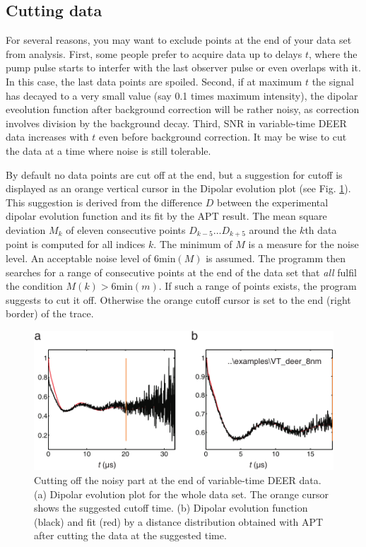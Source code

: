 \documentclass{article}
\begin{document}
\subsection{Cutting data}
For several reasons, you may want to exclude points at the end of
your data set from analysis. First, some people prefer to acquire data up to
delays $t$, where the pump pulse starts to interfer with the last observer pulse
or even overlaps with it. In this case, the last data points are spoiled. Second,
if at maximum $t$ the signal has decayed to a very small value (say 0.1 times
maximum intensity), the dipolar eveolution function after background correction
will be rather noisy, as correction involves division by the background decay.
Third, SNR in variable-time DEER data increases with $t$ even before background
correction. It may be wise to cut the data at a time where noise is still tolerable.

By default no data points are cut off at the end, but a suggestion for cutoff is displayed as an orange vertical cursor in the {\ttfamily Dipolar evolution} plot (see Fig. \ref{fig:manfig4}). This suggestion is derived from the difference $D$ between the experimental dipolar evolution function and its fit by the APT result. The mean square deviation $M_k$ of eleven consecutive points $D_{k-5}\ldots D_{k+5}$ around the $k$th data point is computed for all indices $k$. The minimum of $M$ is a measure for the noise level. An acceptable noise level of $6\mathrm{min}(M)$ is assumed. The programm then searches for a range of consecutive points at the end of the data set that \emph{all} fulfil the condition $M(k)>6\mathrm{min}(m)$. If such a range of points exists, the program suggests to cut it off. Otherwise the orange cutoff cursor is set to the end (right border) of the trace.

\begin{figure}[ht]
 	\begin{center}
  \includegraphics[width=1.0\textwidth]{fig4.pdf}
	\end{center}
	\caption{Cutting off the noisy part at the end of variable-time DEER data. (a) {\ttfamily Dipolar evolution} plot for the whole data set. The orange cursor shows the suggested cutoff time. (b) Dipolar evolution function (black) and
fit (red) by a distance distribution obtained with APT after cutting the data at the suggested time.}
	\label{fig:manfig4}
\end{figure}
\end{document}
